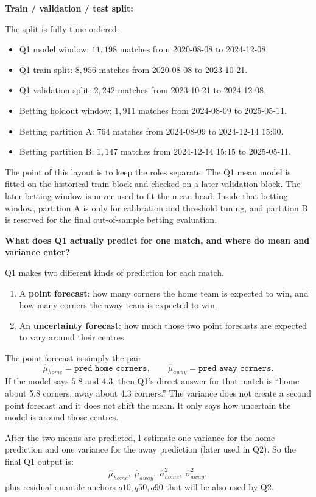 \documentclass{article}
\begin{document}
\noindent \textbf{Train / validation / test split:}

\noindent The split is fully time ordered.
\begin{itemize}
    \item Q1 model window: \(11{,}198\) matches from 2020-08-08 to 2024-12-08.
    \item Q1 train split: \(8{,}956\) matches from 2020-08-08 to 2023-10-21.
    \item Q1 validation split: \(2{,}242\) matches from 2023-10-21 to 2024-12-08.
    \item Betting holdout window: \(1{,}911\) matches from 2024-08-09 to 2025-05-11.
    \item Betting partition A: \(764\) matches from 2024-08-09 to 2024-12-14 15:00.
    \item Betting partition B: \(1{,}147\) matches from 2024-12-14 15:15 to 2025-05-11.
\end{itemize}
The point of this layout is to keep the roles separate. The Q1 mean model is fitted on the historical train block and checked on a later validation block. The later betting window is never used to fit the mean head. Inside that betting window, partition A is only for calibration and threshold tuning, and partition B is reserved for the final out-of-sample betting evaluation.


\noindent \textbf{What does Q1 actually predict for one match, and where do mean and variance enter?}

\noindent Q1 makes two different kinds of prediction for each match.
\begin{enumerate}
    \item A \textbf{point forecast}: how many corners the home team is expected to win, and how many corners the away team is expected to win.
    \item An \textbf{uncertainty forecast}: how much those two point forecasts are expected to vary around their centres.
\end{enumerate}

The point forecast is simply the pair
\[
\hat{\mu}_{home}=\texttt{pred\_home\_corners},\qquad
\hat{\mu}_{away}=\texttt{pred\_away\_corners}.
\]
If the model says \(5.8\) and \(4.3\), then Q1's direct answer for that match is ``home about 5.8 corners, away about 4.3 corners.'' The variance does not create a second point forecast and it does not shift the mean. It only says how uncertain the model is around those centres.

After the two means are predicted, I estimate one variance for the home prediction and one variance for the away prediction (later used in Q2). So the final Q1 output is:
\[
\hat{\mu}_{home},\;
\hat{\mu}_{away},\;
\hat{\sigma}^{2}_{home},\;
\hat{\sigma}^{2}_{away},
\]
plus residual quantile anchors \(q10, q50, q90\) that will be also used by Q2.
\end{document}
